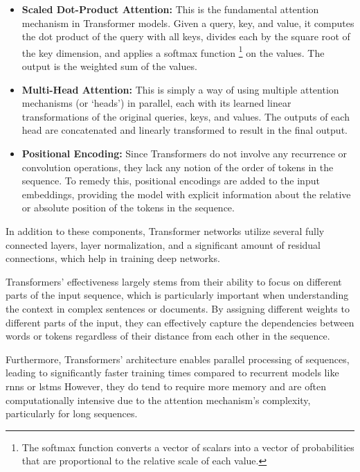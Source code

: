 \begin{itemize}
	\item \textbf{Scaled Dot-Product Attention:} This is the fundamental attention
	      mechanism in Transformer models. Given a query, key, and value, it computes
	      the dot product of the query with all keys, divides each by the square root
	      of the key dimension, and applies a softmax function
	      \footnote{The softmax function converts a vector of scalars into a
		      vector of probabilities that are proportional to the relative scale
		      of each value.} on the values.
	      The output is the weighted sum of the values.

	\item \textbf{Multi-Head Attention:} This is simply a way of using multiple
	      attention mechanisms (or `heads') in parallel, each with its learned linear
	      transformations of the original queries, keys, and values. The outputs of
	      each head are concatenated and linearly transformed to result in the final output.

	\item \textbf{Positional Encoding:} Since Transformers do not involve any
	      recurrence or convolution operations, they lack any notion of the order of
	      tokens in the sequence. To remedy this, positional encodings are added to
	      the input embeddings, providing the model with explicit information about
	      the relative or absolute position of the tokens in the sequence.
\end{itemize}

In addition to these components, Transformer networks utilize several fully
connected layers, layer normalization, and a significant amount of residual
connections, which help in training deep networks.

Transformers' effectiveness largely stems from their ability to focus on
different parts of the input sequence, which is particularly important when
understanding the context in complex sentences or documents. By assigning
different weights to different parts of the input, they can effectively capture
the dependencies between words or tokens regardless of their distance from each
other in the sequence.

Furthermore, Transformers' architecture enables parallel processing of
sequences, leading to significantly faster training times compared to recurrent
models like \glspl{rnn} or \glspl{lstm} However, they do tend to require more
memory and are often computationally intensive due to the attention mechanism's
complexity, particularly for long sequences.


